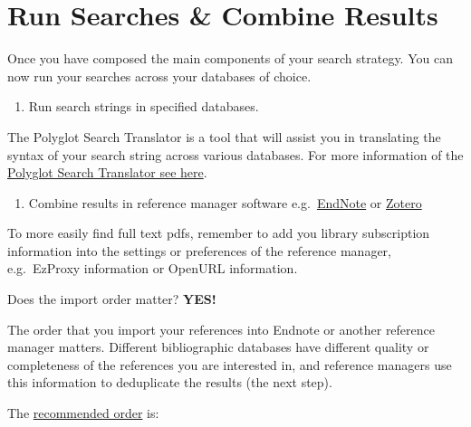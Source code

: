 \documentclass[
]{book}
\providecommand{\tightlist}{%
  \setlength{\itemsep}{0pt}\setlength{\parskip}{0pt}}
\begin{document}
\hypertarget{run-searches-combine-results}{%
\section{Run Searches \& Combine Results}\label{run-searches-combine-results}}

Once you have composed the main components of your search strategy. You can now run your searches across your databases of choice.

\begin{enumerate}
\def\labelenumi{\arabic{enumi}.}
\tightlist
\item
  Run search strings in specified databases.
\end{enumerate}

The Polyglot Search Translator is a tool that will assist you in translating the syntax of your search string across various databases. For more information of the \href{https://sr-accelerator.com/\#/polyglot}{Polyglot Search Translator see here}.

\begin{enumerate}
\def\labelenumi{\arabic{enumi}.}
\setcounter{enumi}{1}
\tightlist
\item
  Combine results in reference manager software e.g.~\href{https://endnote.com/}{EndNote} or \href{https://www.zotero.org/}{Zotero}
\end{enumerate}

To more easily find full text pdfs, remember to add you library subscription information into the settings or preferences of the reference manager, e.g.~EzProxy information or OpenURL information.

Does the import order matter? \textbf{YES!}

The order that you import your references into Endnote or another reference manager matters. Different bibliographic databases have different quality or completeness of the references you are interested in, and reference managers use this information to deduplicate the results (the next step).

The \href{https://blogs.lshtm.ac.uk/library/2018/12/07/removing-duplicates-from-an-endnote-library/}{recommended order} is:
\end{document}

